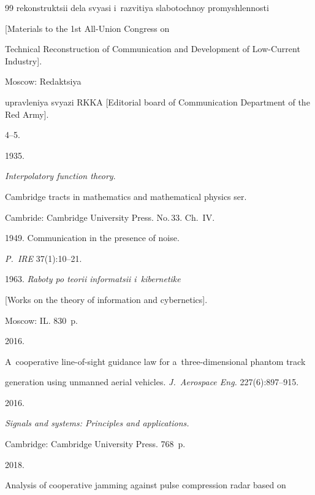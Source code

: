 {{\begin{thebibliography}{99}
{rekonstruktsii dela svyasi i~razvitiya slabotochnoy promyshlennosti}


[Materials to the 1st All-Union Congress on 


Technical Reconstruction of Communication and Development of Low-Current Industry]. 


Moscow: Redaktsiya 


upravleniya svyazi RKKA [Editorial board of Communication Department of the Red Army]. 


4--5.




 1935. 


\textit{Interpolatory function theory}. 


Cambridge tracts in mathematics and mathematical physics ser. 


 Cambride: Cambridge University Press. No.\,33. Ch.~IV.


 




 1949. Communication in the presence of noise. 


\textit{P.~IRE} 37(1):10--21.




 1963. \textit{Raboty po teorii informatsii i~kibernetike}


[Works on the theory of information and cybernetics]. 


Moscow: IL. 830~p.







 2016. 


A~cooperative line-of-sight guidance law for a~three-dimensional phantom track 


generation using unmanned aerial vehicles. \textit{J.~Aerospace Eng.} 227(6):897--915. 




 2016. 


\textit{Signals and systems: Principles and applications.}


 Cambridge: Cambridge University Press. 768~p.




 2018. 


Analysis of cooperative jamming against pulse compression radar based on 



\end{thebibliography}}}
